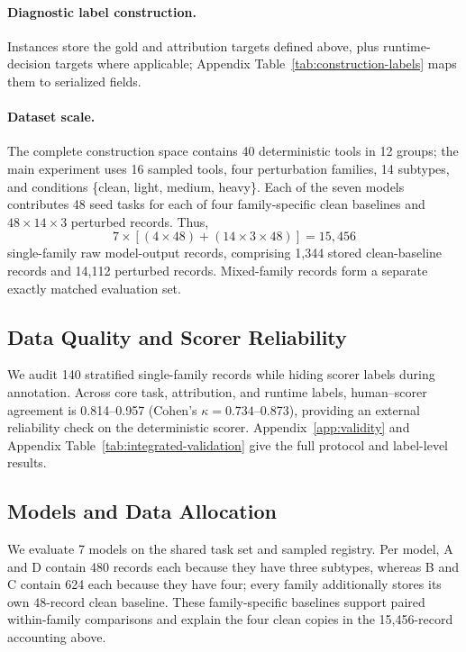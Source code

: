 \documentclass[11pt]{article}
\begin{document}
\paragraph{Diagnostic label construction.}
Instances store the gold and attribution targets defined above, plus runtime-decision targets where applicable; Appendix Table~\ref{tab:construction-labels} maps them to serialized fields.

\paragraph{Dataset scale.}
The complete construction space contains 40 deterministic tools in 12 groups; the main experiment uses 16 sampled tools, four perturbation families, 14 subtypes, and conditions \{clean, light, medium, heavy\}. Each of the seven models contributes 48 seed tasks for each of four family-specific clean baselines and $48 \times 14 \times 3$ perturbed records. Thus,
\[
7 \times \left[(4 \times 48) + (14 \times 3 \times 48)\right] = 15{,}456
\]
single-family raw model-output records, comprising 1,344 stored clean-baseline records and 14,112 perturbed records. Mixed-family records form a separate exactly matched evaluation set.

\subsection{Data Quality and Scorer Reliability}

We audit 140 stratified single-family records while hiding scorer labels during annotation. Across core task, attribution, and runtime labels, human--scorer agreement is 0.814--0.957 (Cohen's $\kappa=0.734$--0.873), providing an external reliability check on the deterministic scorer. Appendix~\ref{app:validity} and Appendix Table~\ref{tab:integrated-validation} give the full protocol and label-level results.

\subsection{Models and Data Allocation}

We evaluate 7 models on the shared task set and sampled registry. Per model, A and D contain 480 records each because they have three subtypes, whereas B and C contain 624 each because they have four; every family additionally stores its own 48-record clean baseline. These family-specific baselines support paired within-family comparisons and explain the four clean copies in the 15,456-record accounting above.
\end{document}

